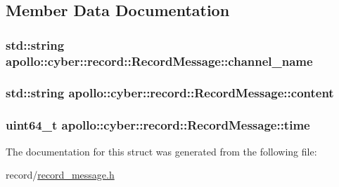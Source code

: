 \subsection{Member Data Documentation}
\hypertarget{structapollo_1_1cyber_1_1record_1_1RecordMessage_a4e9bb68fc38cab41f416a7ad386ce088}{
\subsubsection[{channel\-\_\-name}]{\setlength{\rightskip}{0pt plus 5cm}std\-::string apollo\-::cyber\-::record\-::\-Record\-Message\-::channel\-\_\-name}}\label{structapollo_1_1cyber_1_1record_1_1RecordMessage_a4e9bb68fc38cab41f416a7ad386ce088}
\hypertarget{structapollo_1_1cyber_1_1record_1_1RecordMessage_a0de1a97f8e498da5378a9ff880700ee2}{
\subsubsection[{content}]{\setlength{\rightskip}{0pt plus 5cm}std\-::string apollo\-::cyber\-::record\-::\-Record\-Message\-::content}}\label{structapollo_1_1cyber_1_1record_1_1RecordMessage_a0de1a97f8e498da5378a9ff880700ee2}
\hypertarget{structapollo_1_1cyber_1_1record_1_1RecordMessage_a35060d68dd1506845902a6f9b91c623b}{
\subsubsection[{time}]{\setlength{\rightskip}{0pt plus 5cm}uint64\-\_\-t apollo\-::cyber\-::record\-::\-Record\-Message\-::time}}\label{structapollo_1_1cyber_1_1record_1_1RecordMessage_a35060d68dd1506845902a6f9b91c623b}


The documentation for this struct was generated from the following file\-:\begin{DoxyCompactItemize}
\item 
record/\hyperlink{record__message_8h}{record\-\_\-message.\-h}\end{DoxyCompactItemize}
